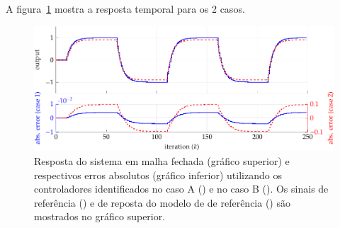 \begin{exmp}
A figura~\ref{fig:Figs-RespostaSist2aordNARX-png} mostra a resposta temporal para os 2 casos.

\begin{figure}[H]
      
  \centering
  \includegraphics[width=1\textwidth]{./Figs/Cap5/ex51_resp_temporal_mf_editado.tex.pdf}
  \caption{Resposta do sistema em malha fechada (gráfico superior) e respectivos erros absolutos (gráfico inferior) utilizando os controladores identificados no caso A () e no caso B (). Os sinais de referência () e de reposta do modelo de de referência () são mostrados no gráfico superior.}
  \label{fig:Figs-RespostaSist2aordNARX-png}
\end{figure}


\end{exmp}

